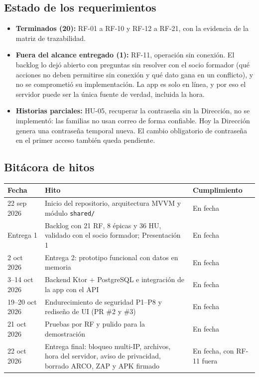 \subsection{Estado de los requerimientos}\label{sec:estado}
\begin{itemize}
	\item \textbf{Terminados (20):} RF-01 a RF-10 y RF-12 a RF-21, con la evidencia de la matriz de trazabilidad.
	\item \textbf{Fuera del alcance entregado (1):} RF-11, operación sin conexión. El backlog lo dejó abierto con preguntas sin resolver con el socio formador (qué acciones no deben permitirse sin conexión y qué dato gana en un conflicto), y no se comprometió su implementación. La app es solo en línea, y por eso el servidor puede ser la única fuente de verdad, incluida la hora.
	\item \textbf{Historias parciales:} HU-05, recuperar la contraseña sin la Dirección, no se implementó: las familias no usan correo de forma confiable. Hoy la Dirección genera una contraseña temporal nueva. El cambio obligatorio de contraseña en el primer acceso también queda pendiente.
\end{itemize}

\subsection{Bitácora de hitos}
\begin{longtable}{p{2.6cm}p{8.4cm}p{3.6cm}}
\toprule
\textbf{Fecha} & \textbf{Hito} & \textbf{Cumplimiento}\\\midrule\endhead
22 sep 2026 & Inicio del repositorio, arquitectura MVVM y módulo \texttt{shared/\allowbreak{}} & En fecha\\
Entrega 1 & Backlog con 21 RF, 8 épicas y 36 HU, validado con el socio formador; Presentación 1 & En fecha\\
2 oct 2026 & Entrega 2: prototipo funcional con datos en memoria & En fecha\\
3--14 oct 2026 & Backend Ktor + PostgreSQL e integración de la app con el API & En fecha\\
19--20 oct 2026 & Endurecimiento de seguridad P1--P8 y rediseño de UI (PR \#2 y \#3) & En fecha\\
21 oct 2026 & Pruebas por RF y pulido para la demostración & En fecha\\
22 oct 2026 & Entrega final: bloqueo multi-IP, archivos, hora del servidor, aviso de privacidad, borrado ARCO, ZAP y APK firmado & En fecha, con RF-11 fuera\\
\bottomrule
\end{longtable}

